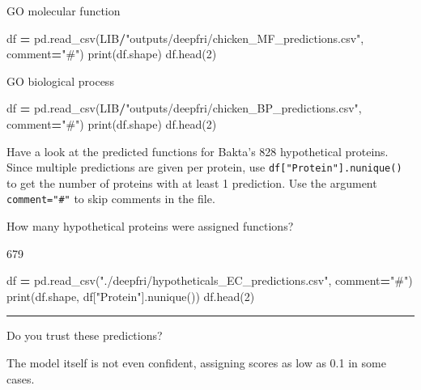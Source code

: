 \documentclass[
]{book}
\newenvironment{Shaded}{\begin{snugshade}}{\end{snugshade}}
\newcommand{\BuiltInTok}[1]{#1}
\newcommand{\DecValTok}[1]{\textcolor[rgb]{0.00,0.00,0.81}{#1}}
\newcommand{\NormalTok}[1]{#1}
\newcommand{\OperatorTok}[1]{\textcolor[rgb]{0.81,0.36,0.00}{\textbf{#1}}}
\newcommand{\StringTok}[1]{\textcolor[rgb]{0.31,0.60,0.02}{#1}}
\begin{document}
GO molecular function

\begin{Shaded}
\begin{Highlighting}[numbers=left,,]
\NormalTok{df }\OperatorTok{=}\NormalTok{ pd.read\_csv(LIB}\OperatorTok{/}\StringTok{"outputs/deepfri/chicken\_MF\_predictions.csv"}\NormalTok{, comment}\OperatorTok{=}\StringTok{"\#"}\NormalTok{)}
\BuiltInTok{print}\NormalTok{(df.shape)}
\NormalTok{df.head(}\DecValTok{2}\NormalTok{)}
\end{Highlighting}
\end{Shaded}

GO biological process

\begin{Shaded}
\begin{Highlighting}[numbers=left,,]
\NormalTok{df }\OperatorTok{=}\NormalTok{ pd.read\_csv(LIB}\OperatorTok{/}\StringTok{"outputs/deepfri/chicken\_BP\_predictions.csv"}\NormalTok{, comment}\OperatorTok{=}\StringTok{"\#"}\NormalTok{)}
\BuiltInTok{print}\NormalTok{(df.shape)}
\NormalTok{df.head(}\DecValTok{2}\NormalTok{)}
\end{Highlighting}
\end{Shaded}

Have a look at the predicted functions for Bakta's 828 hypothetical proteins. Since multiple predictions are given per protein,
use \texttt{df{[}"Protein"{]}.nunique()} to get the number of proteins with at least 1 prediction. Use the argument \texttt{comment="\#"} to skip comments in the file.

How many hypothetical proteins were assigned functions?

679

\begin{Shaded}
\begin{Highlighting}[numbers=left,,]
\NormalTok{df }\OperatorTok{=}\NormalTok{ pd.read\_csv(}\StringTok{"./deepfri/hypotheticals\_EC\_predictions.csv"}\NormalTok{, comment}\OperatorTok{=}\StringTok{"\#"}\NormalTok{)}
\BuiltInTok{print}\NormalTok{(df.shape, df[}\StringTok{"Protein"}\NormalTok{].nunique())}
\NormalTok{df.head(}\DecValTok{2}\NormalTok{)}
\end{Highlighting}
\end{Shaded}

\begin{center}\rule{0.5\linewidth}{0.5pt}\end{center}

Do you trust these predictions?

The model itself is not even confident, assigning scores as low as 0.1 in some cases.
\end{document}
